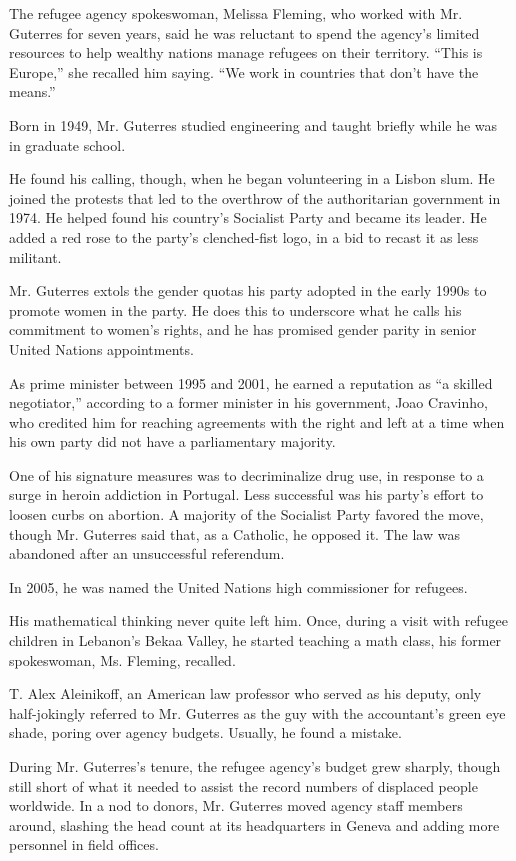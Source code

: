 The refugee agency spokeswoman, Melissa Fleming, who worked with Mr.
Guterres for seven years, said he was reluctant to spend the agency's
limited resources to help wealthy nations manage refugees on their
territory. ``This is Europe,'' she recalled him saying. ``We work in
countries that don't have the means.''

Born in 1949, Mr. Guterres studied engineering and taught briefly while
he was in graduate school.

He found his calling, though, when he began volunteering in a Lisbon
slum. He joined the protests that led to the overthrow of the
authoritarian government in 1974. He helped found his country's
Socialist Party and became its leader. He added a red rose to the
party's clenched-fist logo, in a bid to recast it as less militant.

Mr. Guterres extols the gender quotas his party adopted in the early
1990s to promote women in the party. He does this to underscore what he
calls his commitment to women's rights, and he has promised gender
parity in senior United Nations appointments.

As prime minister between 1995 and 2001, he earned a reputation as ``a
skilled negotiator,'' according to a former minister in his government,
Joao Cravinho, who credited him for reaching agreements with the right
and left at a time when his own party did not have a parliamentary
majority.

One of his signature measures was to decriminalize drug use, in response
to a surge in heroin addiction in Portugal. Less successful was his
party's effort to loosen curbs on abortion. A majority of the Socialist
Party favored the move, though Mr. Guterres said that, as a Catholic, he
opposed it. The law was abandoned after an unsuccessful referendum.

In 2005, he was named the United Nations high commissioner for refugees.

His mathematical thinking never quite left him. Once, during a visit
with refugee children in Lebanon's Bekaa Valley, he started teaching a
math class, his former spokeswoman, Ms. Fleming, recalled.

T. Alex Aleinikoff, an American law professor who served as his deputy,
only half-jokingly referred to Mr. Guterres as the guy with the
accountant's green eye shade, poring over agency budgets. Usually, he
found a mistake.

During Mr. Guterres's tenure, the refugee agency's budget grew sharply,
though still short of what it needed to assist the record numbers of
displaced people worldwide. In a nod to donors, Mr. Guterres moved
agency staff members around, slashing the head count at its headquarters
in Geneva and adding more personnel in field offices.

